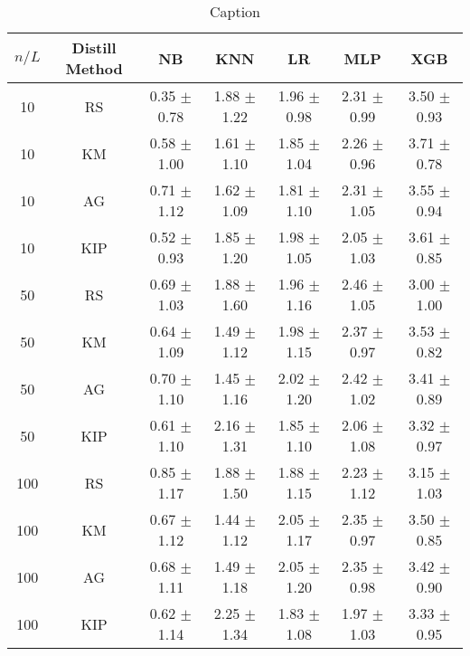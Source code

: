 \begin{table*}[]
	\centering
	{\small
	\begin{tabular}{ccccccc}
		\toprule
		\textbf{$n/L$} & \textbf{Distill Method} & \textbf{NB} & \textbf{KNN} & \textbf{LR} & \textbf{MLP} & \textbf{XGB}\\ \midrule
		10 & RS & 0.35 $\pm$ 0.78 & 1.88 $\pm$ 1.22 & 1.96 $\pm$ 0.98 & 2.31 $\pm$ 0.99 & 3.50 $\pm$ 0.93\\
		10 & KM & 0.58 $\pm$ 1.00 & 1.61 $\pm$ 1.10 & 1.85 $\pm$ 1.04 & 2.26 $\pm$ 0.96 & 3.71 $\pm$ 0.78\\
		10 & AG & 0.71 $\pm$ 1.12 & 1.62 $\pm$ 1.09 & 1.81 $\pm$ 1.10 & 2.31 $\pm$ 1.05 & 3.55 $\pm$ 0.94\\
		10 & KIP & 0.52 $\pm$ 0.93 & 1.85 $\pm$ 1.20 & 1.98 $\pm$ 1.05 & 2.05 $\pm$ 1.03 & 3.61 $\pm$ 0.85\\
		50 & RS & 0.69 $\pm$ 1.03 & 1.88 $\pm$ 1.60 & 1.96 $\pm$ 1.16 & 2.46 $\pm$ 1.05 & 3.00 $\pm$ 1.00\\
		50 & KM & 0.64 $\pm$ 1.09 & 1.49 $\pm$ 1.12 & 1.98 $\pm$ 1.15 & 2.37 $\pm$ 0.97 & 3.53 $\pm$ 0.82\\
		50 & AG & 0.70 $\pm$ 1.10 & 1.45 $\pm$ 1.16 & 2.02 $\pm$ 1.20 & 2.42 $\pm$ 1.02 & 3.41 $\pm$ 0.89\\
		50 & KIP & 0.61 $\pm$ 1.10 & 2.16 $\pm$ 1.31 & 1.85 $\pm$ 1.10 & 2.06 $\pm$ 1.08 & 3.32 $\pm$ 0.97\\
		100 & RS & 0.85 $\pm$ 1.17 & 1.88 $\pm$ 1.50 & 1.88 $\pm$ 1.15 & 2.23 $\pm$ 1.12 & 3.15 $\pm$ 1.03\\
		100 & KM & 0.67 $\pm$ 1.12 & 1.44 $\pm$ 1.12 & 2.05 $\pm$ 1.17 & 2.35 $\pm$ 0.97 & 3.50 $\pm$ 0.85\\
		100 & AG & 0.68 $\pm$ 1.11 & 1.49 $\pm$ 1.18 & 2.05 $\pm$ 1.20 & 2.35 $\pm$ 0.98 & 3.42 $\pm$ 0.90\\
		100 & KIP & 0.62 $\pm$ 1.14 & 2.25 $\pm$ 1.34 & 1.83 $\pm$ 1.08 & 1.97 $\pm$ 1.03 & 3.33 $\pm$ 0.95\\
		\bottomrule
	\end{tabular}
	}
	\caption{Caption}
	\label{my_label}
\end{table*}
